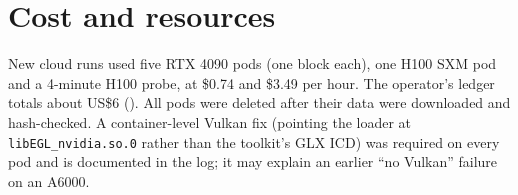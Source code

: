 \section{Cost and resources}
New cloud runs used five RTX 4090 pods (one block each), one H100 SXM pod and a 4-minute H100 probe, at \$0.74 and \$3.49 per hour. The operator's ledger totals about US\$6 (). All pods were deleted after their data were downloaded and hash-checked. A container-level Vulkan fix (pointing the loader at \texttt{libEGL\_nvidia.so.0} rather than the toolkit's GLX ICD) was required on every pod and is documented in the log; it may explain an earlier ``no Vulkan'' failure on an A6000.

